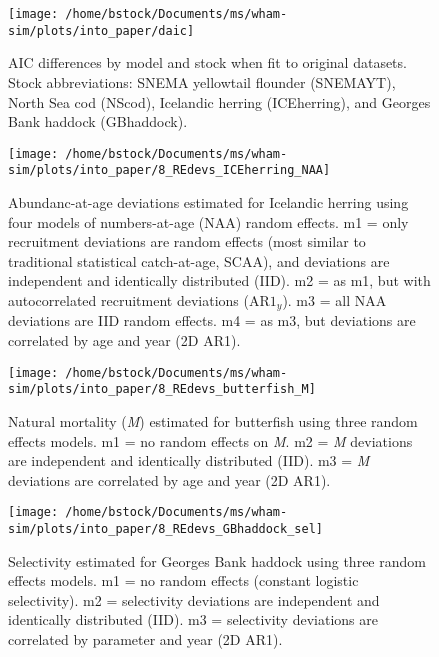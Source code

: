 \documentclass[]{article}
\begin{document}
\pagebreak

\begin{landscape}
\begin{figure}

{\centering \texttt{[image: /home/bstock/Documents/ms/wham-sim/plots/into\_paper/daic]} 

}

\caption{AIC differences by model and stock when fit to original datasets. Stock abbreviations: SNEMA yellowtail flounder (SNEMAYT), North Sea cod (NScod), Icelandic herring (ICEherring), and Georges Bank haddock (GBhaddock).}\label{fig:daic}
\end{figure}
\end{landscape}

\pagebreak

\begin{figure}

{\centering \texttt{[image: /home/bstock/Documents/ms/wham-sim/plots/into\_paper/8\_REdevs\_ICEherring\_NAA]} 

}

\caption{Abundanc-at-age deviations estimated for Icelandic herring using four models of numbers-at-age (NAA) random effects. m1 = only recruitment deviations are random effects (most similar to traditional statistical catch-at-age, SCAA), and deviations are independent and identically distributed (IID). m2 = as m1, but with autocorrelated recruitment deviations ($\text{AR1}_y$). m3 = all NAA deviations are IID random effects. m4 = as m3, but deviations are correlated by age and year (2D AR1).}\label{fig:devs-ICEherring-naa}
\end{figure}

\pagebreak

\begin{figure}

{\centering \texttt{[image: /home/bstock/Documents/ms/wham-sim/plots/into\_paper/8\_REdevs\_butterfish\_M]} 

}

\caption{Natural mortality (\textit{M}) estimated for butterfish using three random effects models. m1 = no random effects on \textit{M}. m2 = \textit{M} deviations are independent and identically distributed (IID). m3 = \textit{M} deviations are correlated by age and year (2D AR1).}\label{fig:devs-butterfish-m}
\end{figure}

\pagebreak

\begin{figure}

{\centering \texttt{[image: /home/bstock/Documents/ms/wham-sim/plots/into\_paper/8\_REdevs\_GBhaddock\_sel]} 

}

\caption{Selectivity estimated for Georges Bank haddock using three random effects models. m1 = no random effects (constant logistic selectivity). m2 = selectivity deviations are independent and identically distributed (IID). m3 = selectivity deviations are correlated by parameter and year (2D AR1).}\label{fig:devs-GBhaddock-sel}
\end{figure}
\end{document}
